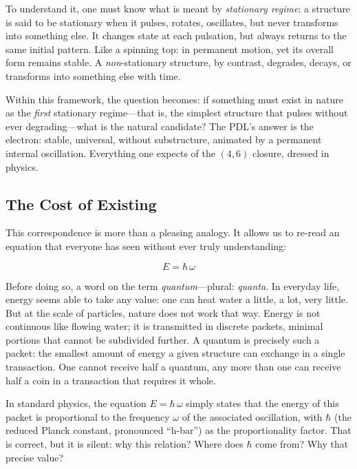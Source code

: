 \documentclass[12pt, a4paper, openright]{book}
\begin{document}
\medskip

To understand it, one must know what is meant by \emph{stationary regime}: a structure is said to be stationary when it pulses, rotates, oscillates, but never transforms into something else. It changes state at each pulsation, but always returns to the same initial pattern. Like a spinning top: in permanent motion, yet its overall form remains stable. A \emph{non}-stationary structure, by contrast, degrades, decays, or transforms into something else with time.

\medskip

Within this framework, the question becomes: if something must exist in nature as the \emph{first} stationary regime---that is, the simplest structure that pulses without ever degrading---what is the natural candidate? The PDL's answer is the electron: stable, universal, without substructure, animated by a permanent internal oscillation. Everything one expects of the $(4,6)$ closure, dressed in physics.

\subsection*{The Cost of Existing}

This correspondence is more than a pleasing analogy. It allows us to re-read an equation that everyone has seen without ever truly understanding:

\begin{equation}
E = \hbar\,\omega
\end{equation}

Before doing so, a word on the term \emph{quantum}---plural: \emph{quanta}. In everyday life, energy seems able to take any value: one can heat water a little, a lot, very little. But at the scale of particles, nature does not work that way. Energy is not continuous like flowing water; it is transmitted in discrete packets, minimal portions that cannot be subdivided further. A quantum is precisely such a packet: the smallest amount of energy a given structure can exchange in a single transaction. One cannot receive half a quantum, any more than one can receive half a coin in a transaction that requires it whole.

\medskip

In standard physics, the equation $E = \hbar\,\omega$ simply states that the energy of this packet is proportional to the frequency $\omega$ of the associated oscillation, with $\hbar$ (the reduced Planck constant, pronounced ``h-bar'') as the proportionality factor. That is correct, but it is silent: why this relation? Where does $\hbar$ come from? Why that precise value?
\end{document}
